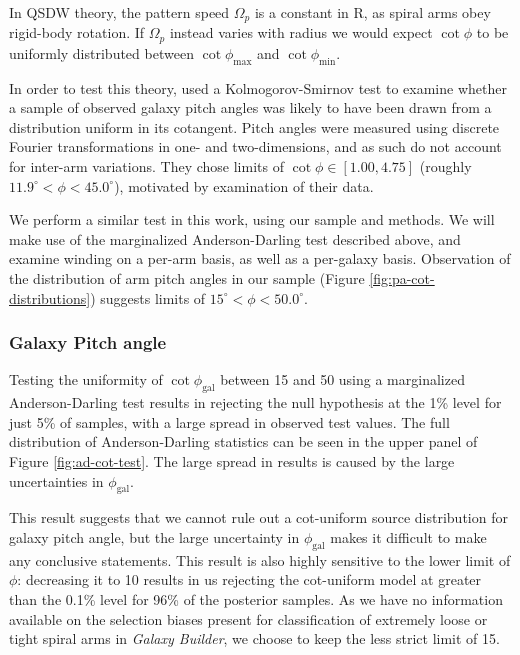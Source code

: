 In QSDW theory, the pattern speed $\Omega_p$ is a constant in R, as spiral arms obey rigid-body rotation. If $\Omega_p$ instead varies with radius we would expect $\cot{\phi}$ to be uniformly distributed between $\cot{\phi_\mathrm{max}}$ and $\cot{\phi_\mathrm{min}}$.

In order to test this theory, \citet{2019arXiv190910291P} used a Kolmogorov-Smirnov test to examine whether a sample of observed galaxy pitch angles was likely to have been drawn from a distribution uniform in its cotangent. Pitch angles were measured using discrete Fourier transformations in one- and two-dimensions, and as such do not account for inter-arm variations. They chose limits of $\cot{\phi} \in [1.00, 4.75]$ (roughly $11.9^\circ < \phi < 45.0^\circ$), motivated by examination of their data.

We perform a similar test in this work, using our sample and methods. We will make use of the marginalized Anderson-Darling test described above, and examine winding on a per-arm basis, as well as a per-galaxy basis. Observation of the distribution of arm pitch angles in our sample (Figure \ref{fig:pa-cot-distributions}) suggests limits of $15^\circ < \phi < 50.0^\circ$.

\subsubsection{Galaxy Pitch angle}

Testing the uniformity of $\cot\phi_\mathrm{gal}$ between {15\degree} and {50\degree} using a marginalized Anderson-Darling test results in rejecting the null hypothesis at the 1\% level for just 5\% of samples, with a large spread in observed test values. The full distribution of Anderson-Darling statistics can be seen in the upper panel of Figure \ref{fig:ad-cot-test}. The large spread in results is caused by the large uncertainties in $\phi_\mathrm{gal}$.

This result suggests that we cannot rule out a cot-uniform source distribution for galaxy pitch angle, but the large uncertainty in $\phi_\mathrm{gal}$ makes it difficult to make any conclusive statements. This result is also highly sensitive to the lower limit of $\phi$: decreasing it to {10\degree} results in us rejecting the cot-uniform model at greater than the 0.1\% level for 96\% of the posterior samples. As we have no information available on the selection biases present for classification of extremely loose or tight spiral arms in \textit{Galaxy Builder}, we choose to keep the less strict limit of {15\degree}.

